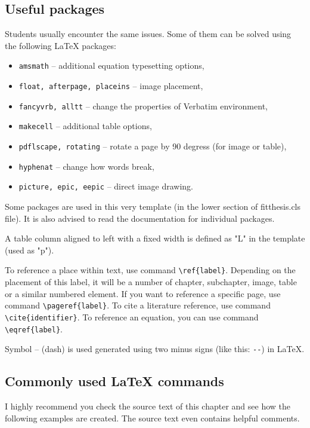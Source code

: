 \subsection*{Useful packages}

Students usually encounter the same issues. Some of them can be solved using the following \LaTeX{} packages:

\begin{itemize}
  \item \verb|amsmath| -- additional equation typesetting options,
  \item \verb|float, afterpage, placeins| -- image placement,
  \item \verb|fancyvrb, alltt| -- change the properties of Verbatim environment, 
  \item \verb|makecell| -- additional table options,
  \item \verb|pdflscape, rotating| -- rotate a page by 90 degress (for image or table),
  \item \verb|hyphenat| -- change how words break,
  \item \verb|picture, epic, eepic| -- direct image drawing.
\end{itemize}

Some packages are used in this very template (in the lower section of fitthesis.cls file). It is also advised to read the documentation for individual packages.

A table column aligned to left with a fixed width is defined as "L" in the template (used as "p").

To reference a place within text, use command \verb|\ref{label}|. Depending on the placement of this label, it will be a number of chapter, subchapter, image, table or a similar numbered element. If you want to reference a specific page, use command \verb|\pageref{label}|. To cite a literature reference, use command \verb|\cite{identifier}|. To reference an equation, you can use command \verb|\eqref{label}|.

Symbol -- (dash) is used generated using two minus signs (like this: \verb|--|) in \LaTeX.

\subsection*{Commonly used \LaTeX{} commands}
\label{sec:Fragments}

I highly recommend you check the source text of this chapter and see how the following examples are created. The source text even contains helpful comments.

